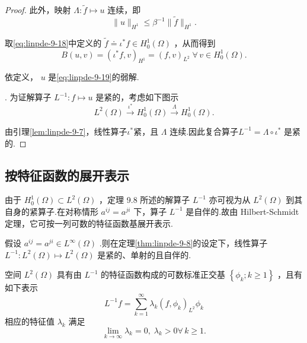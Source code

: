 \begin{proof}
此外，映射 $\Lambda  : \widetilde{f} \mapsto  u$ 连续，即
\[
\| u{\| }_{{H}^{1}} \leq  {\beta }^{-1}\| \widetilde{f}{\| }_{{H}^{1}}.
\]

取\eqref{eq:linpde-9-18}中定义的 $\widetilde{f} \doteq  {\iota }^{ * }f \in  {H}_{0}^{1}\left( \Omega \right)$ ，从而得到
\begin{equation}\tag{9.25}\label{eq:linpde-9-25}
B\left(  {u,v}\right)   = {\left( {\iota }^{ * }f,v\right) }_{{H}^{1}} = {\left( f,v\right) }_{{L}^{2}}\;\forall\,v \in  {H}_{0}^{1}\left( \Omega \right) .
\end{equation}

依定义， $u$ 是\eqref{eq:linpde-9-19}的弱解.

. 为证解算子 ${L}^{-1} : f \mapsto  u$ 是紧的，考虑如下图示
\[
{L}^{2}\left( \Omega \right) \overset{{\iota }^{ * }}{ \rightarrow  }{H}_{0}^{1}\left( \Omega \right) \overset{\Lambda }{ \rightarrow  }{H}_{0}^{1}\left( \Omega \right) .
\]

由引理\ref{lem:linpde-9-7}，线性算子${\iota }^{ * }$紧，且 $\Lambda$ 连续.因此复合算子${L}^{-1} = \Lambda  \circ  {\iota }^{ * }$ 是紧的.
\end{proof}

\subsection{按特征函数的展开表示}
由于 ${H}_{0}^{1}\left( \Omega \right)  \subset  {L}^{2}\left( \Omega \right)$ ，定理 9.8 所述的解算子 ${L}^{-1}$ 亦可视为从 ${L}^{2}\left( \Omega \right)$ 到其自身的紧算子.在对称情形 ${a}^{ij} = {a}^{ji}$ 下，算子 ${L}^{-1}$ 是自伴的.故由 Hilbert-Schmidt 定理，它可按一列可数的特征函数基展开表示.
\begin{theorem}\label{thm:linpde-9-9}
假设 ${a}^{ij} = {a}^{ji} \in  {L}^{\infty }\left( \Omega \right)$ .则在定理\ref{thm:linpde-9-8}的设定下，线性算子 ${L}^{-1} : {L}^{2}\left( \Omega \right)  \mapsto  {L}^{2}\left( \Omega \right)$ 是紧的、单射的且自伴的.

空间 ${L}^{2}\left( \Omega \right)$ 具有由 ${L}^{-1}$ 的特征函数构成的可数标准正交基 $\left\{  {{\phi }_{k};k \geq  1}\right\}$ ，且有如下表示
\begin{equation}\tag{9.26}\label{eq:linpde-9-26}
{L}^{-1}f = \sum_{{k = 1}}^{\infty }{\lambda }_{k}{\left( f,{\phi }_{k}\right) }_{{L}^{2}}{\phi }_{k}
\end{equation}
相应的特征值 ${\lambda }_{k}$ 满足
\begin{equation}\tag{9.27}\label{eq:linpde-9-27}
\mathop{\lim }\limits_{{k \rightarrow  \infty }}{\lambda }_{k} = 0,\;{\lambda }_{k} > 0\forall\,k \geq  1.
\end{equation}
\end{theorem}

